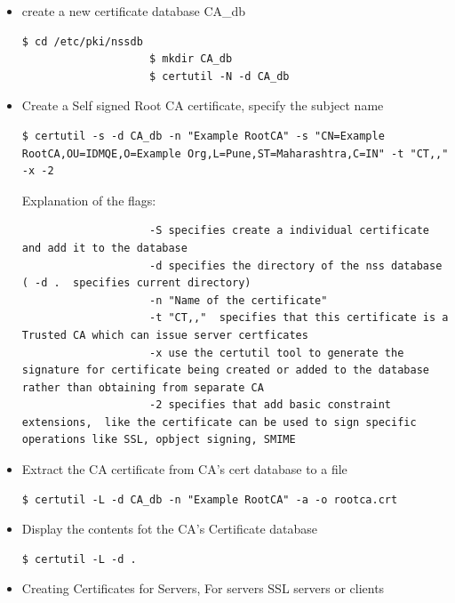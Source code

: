 \documentclass[a4paper]{article}
\begin{document}
\begin{enumerate}[label*=\arabic*.]
\begin{itemize}
            \item create a new certificate database CA\_db
                \begin{lstlisting}[style=BashInputStyle]
                    $ cd /etc/pki/nssdb
                    $ mkdir CA_db
                    $ certutil -N -d CA_db
                \end{lstlisting}
            \item Create a Self signed Root CA certificate, specify the subject name
                \begin{lstlisting}[style=BashInputStyle]
                    $ certutil -s -d CA_db -n "Example RootCA" -s "CN=Example RootCA,OU=IDMQE,O=Example Org,L=Pune,ST=Maharashtra,C=IN" -t "CT,," -x -2
                \end{lstlisting}
                Explanation of the flags:
                \begin{lstlisting}
                    -S specifies create a individual certificate and add it to the database
                    -d specifies the directory of the nss database ( -d .  specifies current directory)
                    -n "Name of the certificate"
                    -t "CT,,"  specifies that this certificate is a Trusted CA which can issue server certficates
                    -x use the certutil tool to generate the signature for certificate being created or added to the database rather than obtaining from separate CA
                    -2 specifies that add basic constraint extensions,  like the certificate can be used to sign specific operations like SSL, opbject signing, SMIME
                \end{lstlisting}
            \item Extract the CA certificate from CA's cert database to a file
                \begin{lstlisting}[style=BashInputStyle]
                    $ certutil -L -d CA_db -n "Example RootCA" -a -o rootca.crt
                \end{lstlisting}
            \item Display the contents fot the CA's Certificate database
                \begin{lstlisting}[style=BashInputStyle] 
                    $ certutil -L -d .
                \end{lstlisting}
            \item Creating Certificates for Servers, For servers SSL servers or clients
                \begin{lstlisting}[style=BashInputStyle]

\end{lstlisting}
\end{itemize}
\end{enumerate}
\end{document}

